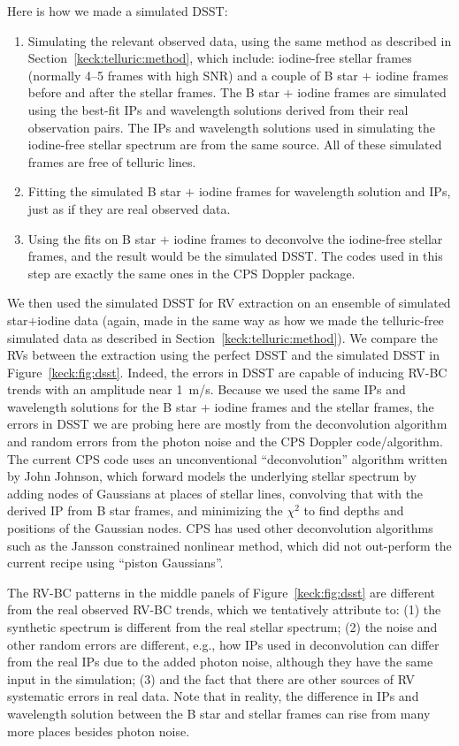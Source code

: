 Here is how we made a simulated DSST:
\begin{enumerate}
  \item Simulating the relevant observed data, using the same method
    as described in Section~\ref{keck:telluric:method}, which include:
    iodine-free stellar frames (normally 4--5 frames with high SNR) and a
    couple of B star $+$ iodine frames before and after the stellar
    frames. The B star $+$ iodine frames are simulated using the best-fit
    IPs and wavelength solutions derived from their real observation
    pairs. The IPs and wavelength solutions used in simulating the
    iodine-free stellar spectrum are from the same source. All of these
    simulated frames are free of telluric lines.
  \item Fitting the simulated B star $+$ iodine frames for wavelength
    solution and IPs, just as if they are real observed data.
  \item Using the fits on B star $+$ iodine frames to deconvolve the
    iodine-free stellar frames, and the result would be the simulated
    DSST. The codes used in this step are exactly the same ones in the
    CPS Doppler package.
\end{enumerate}

We then used the simulated DSST for RV extraction on an ensemble of
simulated star$+$iodine data (again, made in the same way as how we
made the telluric-free simulated data as described in
Section~\ref{keck:telluric:method}). We compare the RVs between the
extraction using the perfect DSST and the simulated DSST in
Figure~\ref{keck:fig:dsst}. Indeed, the errors in DSST are capable of
inducing RV-BC trends with an amplitude near 1~m/s. Because we used
the same IPs and wavelength solutions for the B star $+$ iodine frames
and the stellar frames, the errors in DSST we are probing here are
mostly from the deconvolution algorithm and random errors from the
photon noise and the CPS Doppler code/algorithm. The current CPS code
uses an unconventional ``deconvolution'' algorithm written by John
Johnson, which forward models the underlying stellar spectrum by
adding nodes of Gaussians at places of stellar lines, convolving that
with the derived IP from B star frames, and minimizing the $\chi^2$ to
find depths and positions of the Gaussian nodes. CPS has used other
deconvolution algorithms such as the Jansson constrained nonlinear
method, which did not out-perform the current recipe using ``piston
Gaussians''.

The RV-BC patterns in the middle panels of Figure~\ref{keck:fig:dsst}
are different from the real observed RV-BC trends, which we
tentatively attribute to: (1) the synthetic spectrum is different from
the real stellar spectrum; (2) the noise and other random errors are
different, e.g., how IPs used in deconvolution can differ from the
real IPs due to the added photon noise, although they have the same
input in the simulation; (3) and the fact that there are other sources
of RV systematic errors in real data. Note that in reality, the
difference in IPs and wavelength solution between the B star and
stellar frames can rise from many more places besides photon noise.


